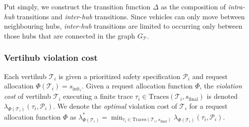 Put simply, we construct the transition function $\Delta$ as the composition of \emph{intra-hub} transitions and \emph{inter-hub} transitions. Since vehicles can only move between neighbouring hubs, \emph{inter-hub} transitions are limited to occurring only between those hubs that are connected in the graph $G_{\mathcal{T}}$.



\subsubsection{Vertihub violation cost}
Each vertihub $\mathcal{T}_i$ is given a prioritized safety specification $\mathcal{P}_i$ and request allocation $\Phi(\mathcal{T}_i) = s_{\text{init}_i}$. Given a request allocation function $\Phi$, the \emph{violation cost} of vertihub $\mathcal{T}_i$ executing a finite trace $\tau_i \in \text{Traces}(\mathcal{T}_i,s_{\text{final}})$ 
is denoted $\lambda_{\Phi(\mathcal{T}_i)}(\tau_i,\mathcal{P}_i)$. We denote the \emph{optimal} violation cost of $\mathcal{T}_i$ for a request allocation function $\Phi$ as $\lambda_{\Phi(\mathcal{T}_i)}^* = \min_{\tau_i \in \text{Traces}(\mathcal{T}_i,s_{\text{final}})} \lambda_{\Phi(\mathcal{T}_i)}(\tau_i,\mathcal{P}_i)$. 

